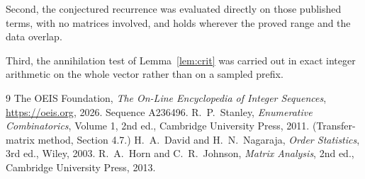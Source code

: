 \documentclass[11pt,a4paper]{article}
\theoremstyle{plain}
\theoremstyle{definition}
\begin{document}
Second, the conjectured recurrence was evaluated directly on those published terms, with no
matrices involved, and holds wherever the proved range and the data overlap.

Third, the annihilation test of Lemma~\ref{lem:crit} was carried out in exact integer
arithmetic on the whole vector rather than on a sampled prefix.

\begin{thebibliography}{9}
 The OEIS Foundation, \emph{The On-Line Encyclopedia of Integer
Sequences}, \url{https://oeis.org}, 2026. Sequence A236496.
 R.~P.~Stanley, \emph{Enumerative Combinatorics}, Volume 1, 2nd ed.,
Cambridge University Press, 2011. (Transfer-matrix method, Section 4.7.)
 H.~A.~David and H.~N.~Nagaraja, \emph{Order Statistics}, 3rd ed., Wiley,
2003.
 R.~A.~Horn and C.~R.~Johnson, \emph{Matrix Analysis}, 2nd ed., Cambridge
University Press, 2013.
\end{thebibliography}
\end{document}
